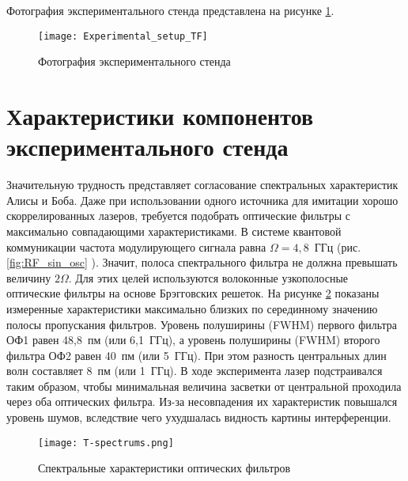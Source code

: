 Фотография экспериментального стенда представлена на рисунке \ref{fig:experimental_setup_TF}.  

 \begin{figure}[ht]
  \centering
	 \texttt{[image: Experimental\_setup\_TF]}
  \caption{Фотография экспериментального стенда}
  \label{fig:experimental_setup_TF}
\end{figure}

\pagebreak

\section{Характеристики компонентов экспериментального стенда} \label{ch:ch5/sec2}

Значительную трудность представляет согласование спектральных характеристик Алисы и Боба. Даже при использовании одного источника для имитации хорошо скоррелированных лазеров, требуется подобрать оптические фильтры с максимально совпадающими характеристиками. В системе квантовой коммуникации частота модулирующего сигнала равна $\Omega = 4,8$~ГГц (рис.\ref{fig:RF_sin_osc} ). Значит, полоса спектрального фильтра не должна превышать величину $2\Omega$. Для этих целей используются волоконные узкополосные оптические фильтры на основе Брэгговских решеток. На рисунке \ref{fig:Spectrums} показаны измеренные характеристики максимально близких по серединному значению полосы пропускания фильтров. Уровень полуширины (FWHM) первого фильтра ОФ1 равен 48,8~пм (или 6,1~ГГц), а уровень полуширины (FWHM) второго фильтра ОФ2 равен 40~пм (или 5~ГГц). При этом разность центральных длин волн составляет 8~пм (или 1~ГГц). В ходе эксперимента лазер подстраивался таким образом, чтобы минимальная величина засветки от центральной проходила через оба оптических фильтра. Из-за несовпадения их характеристик повышался уровень шумов, вследствие чего ухудшалась видность картины интерференции.  

 \begin{figure}[ht]
  \centering
  \texttt{[image: T-spectrums.png]}
  \caption{Спектральные характеристики оптических фильтров}
  \label{fig:Spectrums}
\end{figure}

\pagebreak



